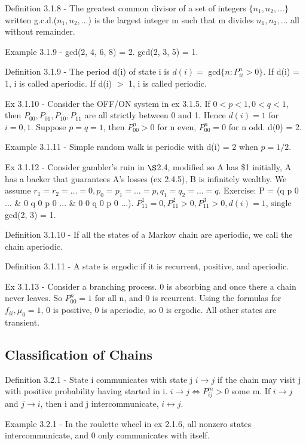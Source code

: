 \documentclass{article}
\begin{document}
Definition 3.1.8 - The greatest common divisor of a set of integers $\{n_1, n_2, \dots\}$ written g.c.d.($n_1, n_2, \dots$) is the largest integer m such that m divides $n_1, n_2, \dots$ all without remainder.

Example 3.1.9 - gcd(2, 4, 6, 8) = 2. gcd(2, 3, 5) = 1.

Definition 3.1.9 - The period d(i) of state i is $d(i) =$ gcd$\{n: P_{ii}^n > 0\}$. If d(i) = 1, i is called aperiodic. If d(i) $>$ 1, i is called periodic.

Ex 3.1.10 - Consider the OFF/ON system in ex 3.1.5. If $0 < p < 1, 0 < q < 1$, then $P_{00}, P_{01}, P_{10}, P_{11}$ are all strictly between 0 and 1. Hence $d(i) = 1$ for $i = 0, 1$. Suppose $p = q = 1$, then $P_{00}^n > 0$ for n even, $P_{00}^n = 0$ for n odd. d(0) = 2.

Example 3.1.11 - Simple random walk is periodic with d(i) = 2 when $p = 1/2$.

Ex 3.1.12 - Consider gambler's ruin in $\S$2.4, modified so A has \$1 initially, A has a backer that guarantees A's losses (ex 2.4.5), B is infinitely wealthy. We assume $r_1 = r_2 = \dots = 0, p_0 = p_1 = \dots = p, q_1 = q_2 = \dots = q$. Exercise: P = (q p 0 ... \& 0 q 0 p 0 ... \& 0 0 q 0 p 0 ...). $P_{11}^1 = 0, P_{11}^2 > 0, P_{11}^3 > 0, d(i) = 1$, single gcd(2, 3) = 1.

Definition 3.1.10 - If all the states of a Markov chain are aperiodic, we call the chain aperiodic.

Definition 3.1.11 - A state is ergodic if it is recurrent, positive, and aperiodic.

Ex 3.1.13 - Consider a branching process. 0 is absorbing and once there a chain never leaves. So $P_{00}^n = 1$ for all n, and 0 is recurrent. Using the formulas for $f_{ii}, \mu_0=1$, 0 is positive, 0 is aperiodic, so 0 is ergodic. All other states are transient.

\subsection{Classification of Chains}

Definition 3.2.1 - State i communicates with state j $i \rightarrow j$ if the chain may visit j with positive probability having started in i. $i \rightarrow j \Leftrightarrow P_{ij}^m > 0$ some m. If $i \rightarrow j$ and $j \rightarrow i$, then i and j intercommunicate, $i \leftrightarrow j$.

Example 3.2.1 - In the roulette wheel in ex 2.1.6, all nonzero states intercommunicate, and 0 only communicates with itself.
\end{document}
